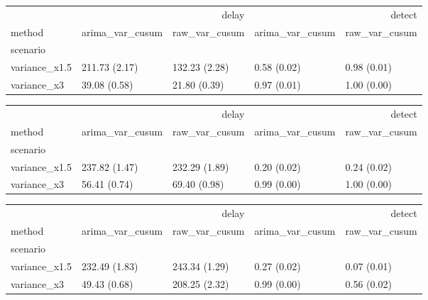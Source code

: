 \begin{tabular}{lllll}
\toprule
 & \multicolumn{2}{r}{delay} & \multicolumn{2}{r}{detect} \\
method & arima_var_cusum & raw_var_cusum & arima_var_cusum & raw_var_cusum \\
scenario &  &  &  &  \\
\midrule
variance_x1.5 & 211.73 (2.17) & 132.23 (2.28) & 0.58 (0.02) & 0.98 (0.01) \\
variance_x3 & 39.08 (0.58) & 21.80 (0.39) & 0.97 (0.01) & 1.00 (0.00) \\
\bottomrule
\end{tabular}

\begin{tabular}{lllll}
\toprule
 & \multicolumn{2}{r}{delay} & \multicolumn{2}{r}{detect} \\
method & arima_var_cusum & raw_var_cusum & arima_var_cusum & raw_var_cusum \\
scenario &  &  &  &  \\
\midrule
variance_x1.5 & 237.82 (1.47) & 232.29 (1.89) & 0.20 (0.02) & 0.24 (0.02) \\
variance_x3 & 56.41 (0.74) & 69.40 (0.98) & 0.99 (0.00) & 1.00 (0.00) \\
\bottomrule
\end{tabular}

\begin{tabular}{lllll}
\toprule
 & \multicolumn{2}{r}{delay} & \multicolumn{2}{r}{detect} \\
method & arima_var_cusum & raw_var_cusum & arima_var_cusum & raw_var_cusum \\
scenario &  &  &  &  \\
\midrule
variance_x1.5 & 232.49 (1.83) & 243.34 (1.29) & 0.27 (0.02) & 0.07 (0.01) \\
variance_x3 & 49.43 (0.68) & 208.25 (2.32) & 0.99 (0.00) & 0.56 (0.02) \\
\bottomrule
\end{tabular}
